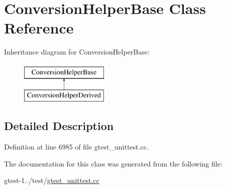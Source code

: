 \hypertarget{classConversionHelperBase}{\section{\-Conversion\-Helper\-Base \-Class \-Reference}
\label{de/db4/classConversionHelperBase}
}
\-Inheritance diagram for \-Conversion\-Helper\-Base\-:\begin{figure}[H]
\begin{center}
\leavevmode
\includegraphics[height=2.000000cm]{de/db4/classConversionHelperBase}
\end{center}
\end{figure}


\subsection{\-Detailed \-Description}


\-Definition at line 6985 of file gtest\-\_\-unittest.\-cc.



\-The documentation for this class was generated from the following file\-:\begin{DoxyCompactItemize}
\item 
gtest-\/1../test/\hyperlink{gtest__unittest_8cc}{gtest\-\_\-unittest.\-cc}\end{DoxyCompactItemize}
